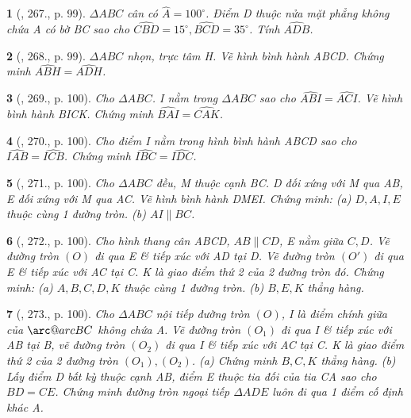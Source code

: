 \documentclass{article}
\makeatletter
\newcommand{\arc@char}{{\usefont{U}{tipa}{m}{n}\symbol{62}}}%
\newcommand{\arc}[1]{\mathpalette\arc@arc{#1}}
\newcommand{\arc@arc}[2]{%
	\sbox0{$\m@th#1#2$}%
	\vbox{
		\hbox{\resizebox{\wd0}{\height}{\arc@char}}
		\nointerlineskip
		\box0
	}%
}
\newtheorem{baitoan}{}
\makeatother
\begin{document}
\begin{baitoan}[\cite{Binh_Toan_9_tap_2}, 267., p. 99]
	$\Delta ABC$ cân có $\widehat{A} = 100^\circ$. Điểm D thuộc nửa mặt phẳng không chứa A có bờ BC sao cho $\widehat{CBD} = 15^\circ,\widehat{BCD} = 35^\circ$. Tính $\widehat{ADB}$.
\end{baitoan}

\begin{baitoan}[\cite{Binh_Toan_9_tap_2}, 268., p. 99]
	$\Delta ABC$ nhọn, trực tâm H. Vẽ hình bình hành ABCD. Chứng minh $\widehat{ABH} = \widehat{ADH}$.
\end{baitoan}

\begin{baitoan}[\cite{Binh_Toan_9_tap_2}, 269., p. 100]
	Cho $\Delta ABC$. I nằm trong $\Delta ABC$ sao cho $\widehat{ABI} = \widehat{ACI}$. Vẽ hình bình hành BICK. Chứng minh $\widehat{BAI} = \widehat{CAK}$.
\end{baitoan}

\begin{baitoan}[\cite{Binh_Toan_9_tap_2}, 270., p. 100]
	Cho điểm I nằm trong hình bình hành ABCD sao cho $\widehat{IAB} = \widehat{ICB}$. Chứng minh $\widehat{IBC} = \widehat{IDC}$.
\end{baitoan}

\begin{baitoan}[\cite{Binh_Toan_9_tap_2}, 271., p. 100]
	Cho $\Delta ABC$ đều, M thuộc cạnh BC. D đối xứng với M qua AB, E đối xứng với M qua AC. Vẽ hình bình hành DMEI. Chứng minh: (a) $D,A,I,E$ thuộc cùng 1 đường tròn. (b) $AI\parallel BC$.
\end{baitoan}

\begin{baitoan}[\cite{Binh_Toan_9_tap_2}, 272., p. 100]
	Cho hình thang cân ABCD, $AB\parallel CD$, E nằm giữa $C,D$. Vẽ đường tròn $(O)$ đi qua E \& tiếp xúc với AD tại D. Vẽ đường tròn $(O')$ đi qua E \& tiếp xúc với AC tại C. K là giao điểm thứ 2 của 2 đường tròn đó. Chứng minh: (a) $A,B,C,D,K$ thuộc cùng 1 đường tròn. (b) $B,E,K$ thẳng hàng.
\end{baitoan}

\begin{baitoan}[\cite{Binh_Toan_9_tap_2}, 273., p. 100]
	Cho $\Delta ABC$ nội tiếp đường tròn $(O)$, I là điểm chính giữa của $\arc{BC}$ không chứa A. Vẽ đường tròn $(O_1)$ đi qua I \& tiếp xúc với AB tại B, vẽ đường tròn $(O_2)$ đi qua I \& tiếp xúc với AC tại C. K là giao điểm thứ 2 của 2 đường tròn $(O_1),(O_2)$. (a) Chứng minh $B,C,K$ thẳng hàng. (b) Lấy điểm D bất kỳ thuộc cạnh AB, điểm E thuộc tia đối của tia CA sao cho $BD = CE$. Chứng minh đường tròn ngoại tiếp $\Delta ADE$ luôn đi qua 1 điểm cố định khác A.
\end{baitoan}
\end{document}
